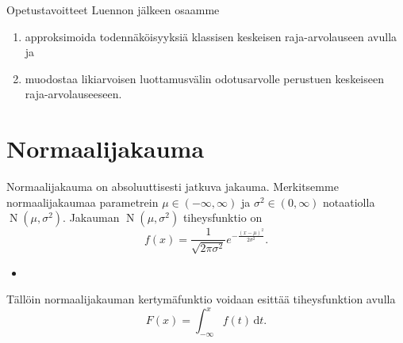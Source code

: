 \documentclass{beamer}
\DeclareMathOperator{\n}{\mathrm N}
\begin{document}

\begin{frame}{Opetustavoitteet}
  Luennon jälkeen osaamme
  \begin{enumerate}
    \item approksimoida todennäköisyyksiä klassisen keskeisen raja-arvolauseen
    avulla ja
    \pause
    \item muodostaa likiarvoisen luottamusvälin odotusarvolle perustuen
    keskeiseen raja-arvolauseeseen.
  \end{enumerate}
\end{frame}


\section{Normaalijakauma}

\begin{frame}
  Normaalijakauma on absoluuttisesti jatkuva jakauma. Merkitsemme
  normaalijakaumaa parametrein $\mu\in(-\infty, \infty)$ ja
  $\sigma^2\in(0,\infty)$ notaatiolla $\n\left(\mu, \sigma^2\right)$. Jakauman
  $\n\left(\mu, \sigma^2\right)$ tiheysfunktio on
  \begin{equation*}
    f(x) = \frac{1}{\sqrt{2\pi\sigma^2}} e^{-\frac{\left(x-\mu\right)^2}
    {2\sigma^2}}.
  \end{equation*}
  \pause
  \begin{itemize}
    \item[]
  \end{itemize}
  Tällöin normaalijakauman kertymäfunktio voidaan esittää tiheysfunktion avulla
  \begin{equation*}
    F\left(x\right) = \int_{-\infty}^{x} f(t)\,\mathrm{d}t.
  \end{equation*}
\end{frame}

\end{document}
